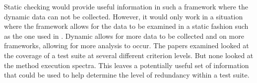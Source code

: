 Static checking would provide useful information in such a framework where the dynamic data can not be collected. However, it would only work in a situation where the framework allows for the data to be examined in a static fashion such as the one used in \cite{li2008static}. Dynamic allows for more data to be collected and on more frameworks, allowing for more analysis to occur. The papers examined looked at the coverage of a test suite at several different criterion levels. But none looked at the method execution spectra. This leaves a potentially useful set of information that could be used to help determine the level of redundancy within a test suite. 